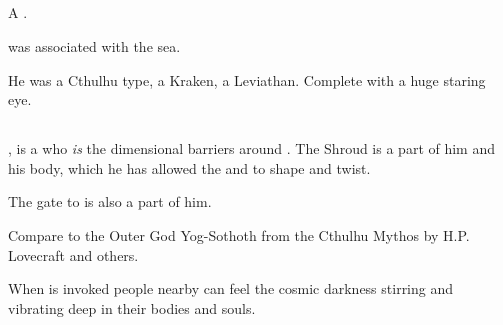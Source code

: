 
















\subsection{\KyaethemChreiAz}
A \xzaishann.

\KyaethemChreiAz was associated with the sea. 

He was a Cthulhu type, a Kraken, a Leviathan. 
Complete with a huge staring eye. 


















\subsection{\NaathKurRamalech}
\index{\NaathKurRamalech}
\NaathKurRamalech{}, is a  who \emph{is} the dimensional barriers around \Miith{}. The Shroud is a part of him and his body, which he has allowed the \dragons{} and \banes{} to shape and twist. 

The gate to \Erebos{} is also a part of him.

Compare to the Outer God Yog-Sothoth from the Cthulhu Mythos by H.P. Lovecraft and others. 

When \NaathKurRamalech{} is invoked people nearby can feel the cosmic darkness stirring and vibrating deep in their bodies and souls. 

